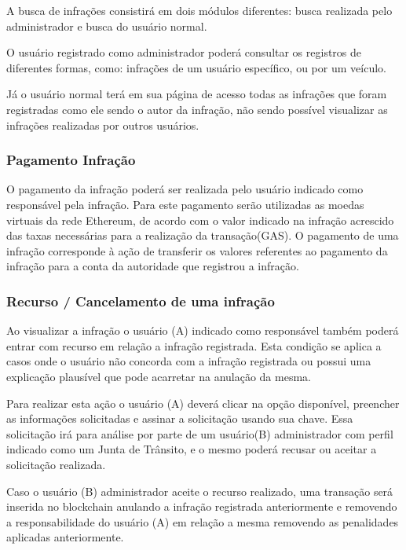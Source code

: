         A busca de infrações consistirá em dois módulos diferentes: busca realizada pelo administrador e busca do usuário normal.
        
        O usuário registrado como administrador poderá consultar os registros de diferentes formas, como: infrações de um usuário específico, ou por um veículo.
        
        Já o usuário normal terá em sua página de acesso todas as infrações que foram registradas como ele sendo o autor da infração, não sendo possível visualizar as infrações realizadas por outros usuários.
    
    \subsubsection{Pagamento Infração}
    
        O pagamento da infração poderá ser realizada pelo usuário indicado como responsável pela infração. Para este pagamento serão utilizadas as moedas virtuais da rede Ethereum, de acordo com o valor indicado na infração acrescido das taxas necessárias para a realização da transação(GAS). O pagamento de uma infração corresponde à ação de transferir os valores referentes ao pagamento da infração para a conta da autoridade que registrou a infração.
    
    
    \subsubsection{Recurso / Cancelamento de uma infração}
    
        Ao visualizar a infração o usuário (A) indicado como responsável também poderá entrar com recurso em relação a infração registrada. Esta condição se aplica a casos onde o usuário não concorda com a infração registrada ou possui uma explicação plausível que pode acarretar na anulação da mesma.
        
        Para realizar esta ação o usuário (A) deverá clicar na opção disponível, preencher as informações solicitadas e assinar a solicitação usando sua chave. Essa solicitação irá para análise por parte de um usuário(B) administrador com perfil indicado como um Junta de Trânsito, e o mesmo poderá recusar ou aceitar a solicitação realizada.
        
        Caso o usuário (B) administrador aceite o recurso realizado, uma transação será inserida no blockchain anulando a infração registrada anteriormente e removendo a responsabilidade do usuário (A) em relação a mesma removendo as penalidades aplicadas anteriormente.
        
